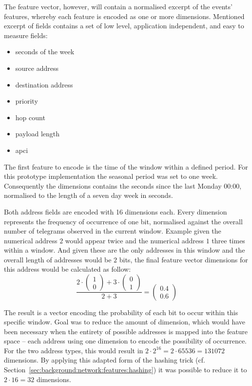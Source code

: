 The feature vector, however, will contain a normalised excerpt of the events' features, whereby each feature is encoded as one or more dimensions.
Mentioned excerpt of fields contains a set of low level, application independent, and easy to measure fields: 
\begin{itemize}
	\item seconds of the week
	\item source address
	\item destination address
	\item priority
	\item hop count
	\item payload length
	\item \gls{apci}
\end{itemize}

The first feature to encode is the time of the window within a defined period. For this prototype implementation the seasonal period was set to one week. Consequently the dimensions contains the seconds since the last Monday 00:00, normalised to the length of a seven day week in seconds.

Both address fields are encoded with 16 dimensions each. Every dimension represents the frequency of occurrence of one bit, normalised against the overall number of telegrams observed in the current window.
Example given the numerical address $2$ would appear twice and the numerical address $1$ three times within a window. And given these are the only addresses in this window and the overall length of addresses would be $2$ bits, the final feature vector dimensions for this address would be calculated as follow:
\[
\dfrac{2 \cdot \begin{pmatrix}1 \\ 0\end{pmatrix} + 3 \cdot \begin{pmatrix}0 \\ 1\end{pmatrix}}{2 + 3} = \begin{pmatrix}0.4 \\ 0.6\end{pmatrix}
\]

The result is a vector encoding the probability of each bit to occur within this specific window.
Goal was to reduce the amount of dimension, which would have been necessary when the entirety of possible addresses is mapped into the feature space -- each address using one dimension to encode the possibility of occurrence.
For the two address types, this would result in $2 \cdot 2^{16} = 2 \cdot 65536 = 131072$ dimensions. By applying this adapted form of the hashing trick (cf. Section~\ref{sec:background:network:features:hashing}) it was possible to reduce it to $2 \cdot 16 = 32$ dimensions.

